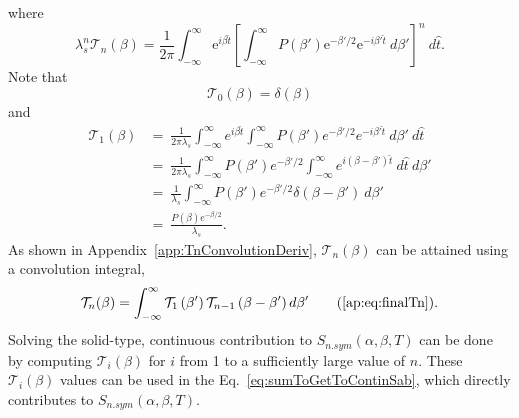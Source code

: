 \documentclass[../master.tex]{subfiles}
\begin{document}
				where
				\begin{equation}
					\lambda_s^n\mathcal{T}_n(\beta)=\frac{1}{2\pi}\int_{-\infty}^{\infty}\mathrm{e}^{i\beta\hat{t}}\left[\int_{-\infty}^{\infty}P(\beta')\mathrm{e}^{-\beta'/2}\mathrm{e}^{-i\beta'\hat{t}}~d\beta'\right]^n~d\hat{t}.
				\end{equation}
				Note that
				\begin{equation}
					\mathcal{T}_0(\beta)=\delta(\beta)
				\end{equation}
				and
				\begin{align}
					\mathcal{T}_1(\beta)&=~\frac{1}{2\pi\lambda_s}\int_{-\infty}^\infty e^{i\beta\hat{t}}\int_{-\infty}^\infty P(\beta')e^{-\beta'/2}e^{-i\beta'\hat{t}}~d\beta'~d\hat{t}\\
					&=~\frac{1}{2\pi\lambda_s}\int_{-\infty}^\infty P(\beta')e^{-\beta'/2} \int_{-\infty}^\infty e^{i(\beta-\beta')\hat{t}}~d\hat{t}~d\beta'\\
					&=~\frac{1}{\lambda_s}\int_{-\infty}^\infty P(\beta')e^{-\beta'/2} \delta(\beta-\beta')~d\beta'\\
					&=~\frac{P(\beta)e^{-\beta/2}}{\lambda_s}.
				\end{align}
				As shown in Appendix~\ref{app:TnConvolutionDeriv}, $\mathcal{T}_n(\beta)$ can be attained using a convolution integral,
				\begin{equation}
					\mathcal{T}_{n}(\beta)=\int_{-\infty}^{\infty}\mathcal{T}_{1}\left(\beta'\right)\mathcal{T}_{n-1}\left(\beta-\beta'\right)d\beta'\tag{\ref{ap:eq:finalTn}}.
				\end{equation}
				Solving the solid-type, continuous contribution to $S_{n.sym}(\alpha,\beta,T)$ can be done by computing $\mathcal{T}_i(\beta)$ for $i$ from 1 to a sufficiently large value of $n$. These $\mathcal{T}_i(\beta)$ values can be used in the Eq.~\ref{eq:sumToGetToContinSab}, which directly contributes to $S_{n.sym}(\alpha,\beta,T)$.
\end{document}
